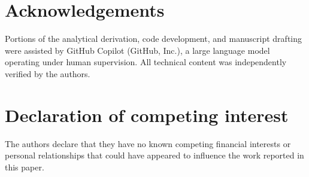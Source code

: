 \documentclass[review]{elsarticle}
\begin{document}
\section*{Acknowledgements}
Portions of the analytical derivation, code development, and manuscript
drafting were assisted by GitHub Copilot (GitHub, Inc.), a large language
model operating under human supervision.  All technical content was
independently verified by the authors.

\section*{Declaration of competing interest}
The authors declare that they have no known competing financial interests
or personal relationships that could have appeared to influence the work
reported in this paper.
\end{document}
